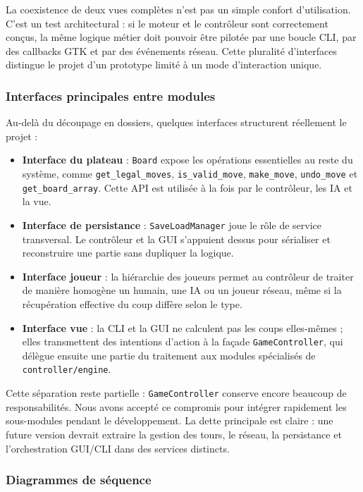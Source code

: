 \documentclass[a4paper]{article}
\begin{document}
La coexistence de deux vues complètes n'est pas un simple confort d'utilisation. C'est un test architectural : si le moteur et le contrôleur sont correctement conçus, la même logique métier doit pouvoir être pilotée par une boucle CLI, par des callbacks GTK et par des événements réseau. Cette pluralité d'interfaces distingue le projet d'un prototype limité à un mode d'interaction unique.

\subsubsection{Interfaces principales entre modules}

Au-delà du découpage en dossiers, quelques interfaces structurent réellement le projet :

\begin{itemize}
    \item \textbf{Interface du plateau} : \texttt{Board} expose les opérations essentielles au reste du système, comme \texttt{get\_legal\_moves}, \texttt{is\_valid\_move}, \texttt{make\_move}, \texttt{undo\_move} et \texttt{get\_board\_array}. Cette API est utilisée à la fois par le contrôleur, les IA et la vue.
    \item \textbf{Interface de persistance} : \texttt{SaveLoadManager} joue le rôle de service transversal. Le contrôleur et la GUI s'appuient dessus pour sérialiser et reconstruire une partie sans dupliquer la logique.
    \item \textbf{Interface joueur} : la hiérarchie des joueurs permet au contrôleur de traiter de manière homogène un humain, une IA ou un joueur réseau, même si la récupération effective du coup diffère selon le type.
    \item \textbf{Interface vue} : la CLI et la GUI ne calculent pas les coups elles-mêmes ; elles transmettent des intentions d'action à la façade \texttt{GameController}, qui délègue ensuite une partie du traitement aux modules spécialisés de \texttt{controller/engine}.
\end{itemize}

Cette séparation reste partielle : \texttt{GameController} conserve encore beaucoup de responsabilités. Nous avons accepté ce compromis pour intégrer rapidement les sous-modules pendant le développement. La dette principale est claire : une future version devrait extraire la gestion des tours, le réseau, la persistance et l'orchestration GUI/CLI dans des services distincts.

\subsubsection{Diagrammes de séquence}
\end{document}
